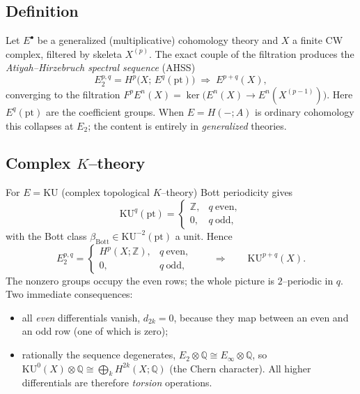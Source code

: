 \documentclass[11pt]{article}
\theoremstyle{definition}
\newcommand{\Z}{\mathbb{Z}}
\newcommand{\Q}{\mathbb{Q}}
\newcommand{\KU}{\mathrm{KU}}
\newcommand{\ptt}{\mathrm{pt}}
\begin{document}
\subsection{Definition}

Let $E^\bullet$ be a generalized (multiplicative) cohomology theory and $X$ a
finite CW complex, filtered by skeleta $X^{(p)}$. The exact couple of the
filtration produces the \emph{Atiyah--Hirzebruch spectral sequence} (AHSS)
\begin{equation}\label{eq:AHSS}
  E_2^{p,q}=H^p\!\big(X;\,E^q(\ptt)\big)\;\Longrightarrow\; E^{p+q}(X),
\end{equation}
converging to the filtration $F^pE^n(X)=\ker\!\big(E^n(X)\to E^n(X^{(p-1)})\big)$.
Here $E^q(\ptt)$ are the coefficient groups. When $E=H(-;A)$ is ordinary
cohomology this collapses at $E_2$; the content is entirely in \emph{generalized}
theories.

\subsection{Complex $K$--theory}

For $E=\KU$ (complex topological $K$--theory) Bott periodicity gives
\[
  \KU^q(\ptt)=\begin{cases}\Z,& q\ \text{even},\\ 0,& q\ \text{odd},\end{cases}
\]
with the Bott class $\beta_{\mathrm{Bott}}\in\KU^{-2}(\ptt)$ a unit. Hence
\begin{equation}\label{eq:E2K}
  E_2^{p,q}=\begin{cases}H^p(X;\Z),& q\ \text{even},\\ 0,& q\ \text{odd},\end{cases}
  \qquad\Longrightarrow\qquad \KU^{p+q}(X).
\end{equation}
The nonzero groups occupy the even rows; the whole picture is $2$--periodic in
$q$. Two immediate consequences:
\begin{itemize}
\item all \emph{even} differentials vanish, $d_{2k}=0$, because they map between
an even and an odd row (one of which is zero);
\item rationally the sequence degenerates, $E_2\otimes\Q\cong E_\infty\otimes\Q$,
so $\KU^0(X)\otimes\Q\cong\bigoplus_k H^{2k}(X;\Q)$ (the Chern character). All
higher differentials are therefore \emph{torsion} operations.
\end{itemize}

\end{document}
